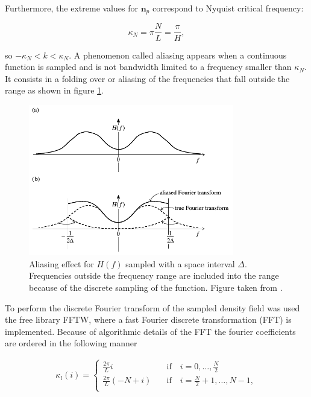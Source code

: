 Furthermore, the extreme values for $\boldsymbol{n}_p$ correspond to Nyquist critical 
frequency: 

\[\kappa_N = \pi\frac{N}{L} = \frac{\pi}{H}, \]

so $-\kappa_N < k < \kappa_N $. A phenomenon called aliasing appears when a continuous 
function is sampled and is not bandwidth limited to a frequency smaller than $\kappa_N$. 
It consists in a folding over or aliasing of the frequencies that fall outside the range
as shown in figure \ref{alias}. 

\begin{figure}[htbp]
       \centering
               \includegraphics[width=0.8\textwidth]{Images/chapter3/aliasing.png}
       \caption{\small Aliasing effect for $H(f)$ sampled with a space interval $\Delta$.
       Frequencies outside the frequency range are included into the range because
       of the discrete sampling of the function. Figure taken from \cite{Press}.}
       \label{alias}
 \end{figure}

To perform the discrete Fourier transform of the sampled density field was used the free 
library FFTW, where a fast Fourier discrete transformation (FFT) is implemented.
Because of algorithmic details of the FFT the fourier coefficients are ordered in the
following manner

\begin{eqnarray*}
\kappa_l(i) =\left\{ \begin{array}{cl}
\frac{2\pi}{L}i \hspace{1em} & \mathrm{if} \hspace{1em} i = 0,\dots ,\frac{N}{2}\\
\frac{2\pi}{L}(-N+i) \hspace{1em} & \mathrm{if} \hspace{1em} i = \frac{N}{2}+1,\dots ,N-1 ,\\
\end{array}\right.
\end{eqnarray*} 


